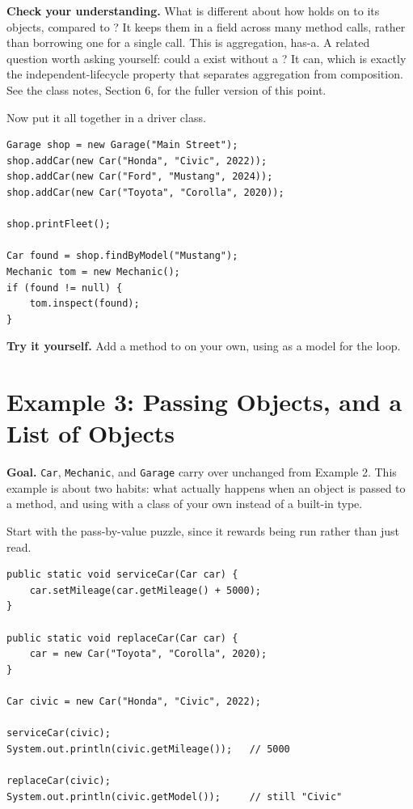 \documentclass[11pt]{article}
\begin{document}
\textbf{Check your understanding.} What is different about how 
holds on to its  objects, compared to ? It keeps them in
a field across many method calls, rather than borrowing one for a single call.
This is aggregation, has-a. A related question worth asking yourself: could a
 exist without a ? It can, which is exactly the
independent-lifecycle property that separates aggregation from composition.
See the class notes, Section 6, for the fuller version of this point.

Now put it all together in a driver class.

\begin{lstlisting}[style=java]
Garage shop = new Garage("Main Street");
shop.addCar(new Car("Honda", "Civic", 2022));
shop.addCar(new Car("Ford", "Mustang", 2024));
shop.addCar(new Car("Toyota", "Corolla", 2020));

shop.printFleet();

Car found = shop.findByModel("Mustang");
Mechanic tom = new Mechanic();
if (found != null) {
    tom.inspect(found);
}
\end{lstlisting}

\textbf{Try it yourself.} Add a  method to
 on your own, using  as a model for the loop.

\section{Example 3: Passing Objects, and a List of Objects}

\textbf{Goal.} \texttt{Car}, \texttt{Mechanic}, and \texttt{Garage} carry over
unchanged from Example 2. This example is about two habits: what actually
happens when an object is passed to a method, and using  with a
class of your own instead of a built-in type.

Start with the pass-by-value puzzle, since it rewards being run rather than
just read.

\begin{lstlisting}[style=java]
public static void serviceCar(Car car) {
    car.setMileage(car.getMileage() + 5000);
}

public static void replaceCar(Car car) {
    car = new Car("Toyota", "Corolla", 2020);
}

Car civic = new Car("Honda", "Civic", 2022);

serviceCar(civic);
System.out.println(civic.getMileage());   // 5000

replaceCar(civic);
System.out.println(civic.getModel());     // still "Civic"
\end{lstlisting}
\end{document}
